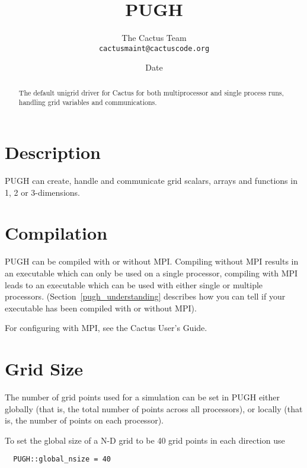\documentclass{article}
\begin{document}
\title{PUGH}
\author{The Cactus Team\\{\tt cactusmaint@cactuscode.org}}
\date{$ $Date$ $}

\maketitle


\begin{abstract}
The default unigrid driver for Cactus for both multiprocessor and single process runs, handling grid variables and communications.
\end{abstract}

\section{Description}

PUGH can create, handle and communicate grid scalars, arrays and functions
in 1, 2 or 3-dimensions.

\section{Compilation}

PUGH can be compiled with or without MPI. Compiling without MPI results
in an executable which can only be used on a single processor, compiling
with MPI leads to an executable which can be used with either single or
multiple processors.
(Section~\ref{pugh_understanding} describes how you can tell if your
executable has been compiled with or without MPI).

For configuring with MPI, see the Cactus User's Guide.

\section{Grid Size}

The number of grid points used for a simulation can be set in PUGH either
globally (that is, the total number of points across all processors), or
locally (that is, the number of points on each processor).

To set the global size of a N-D grid to be 40 grid points in each direction use

\begin{verbatim}
  PUGH::global_nsize = 40
\end{verbatim}
\end{document}
